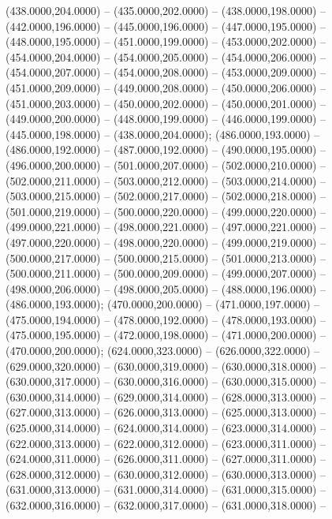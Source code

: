 \begin{scope}[shift={(-231.87,-121.87)}]
\begin{scope}[draw=black,fill=cd7191c,line join=round,line width=0.208pt]
       (438.0000,204.0000) -- (435.0000,202.0000) --
        (438.0000,198.0000) -- (442.0000,196.0000) -- (445.0000,196.0000) --
        (447.0000,195.0000) -- (448.0000,195.0000) -- (451.0000,199.0000) --
        (453.0000,202.0000) -- (454.0000,204.0000) -- (454.0000,205.0000) --
        (454.0000,206.0000) -- (454.0000,207.0000) -- (454.0000,208.0000) --
        (453.0000,209.0000) -- (451.0000,209.0000) -- (449.0000,208.0000) --
        (450.0000,206.0000) -- (451.0000,203.0000) -- (450.0000,202.0000) --
        (450.0000,201.0000) -- (449.0000,200.0000) -- (448.0000,199.0000) --
        (446.0000,199.0000) -- (445.0000,198.0000) -- (438.0000,204.0000);
       (486.0000,193.0000) -- (486.0000,192.0000) --
        (487.0000,192.0000) -- (490.0000,195.0000) -- (496.0000,200.0000) --
        (501.0000,207.0000) -- (502.0000,210.0000) -- (502.0000,211.0000) --
        (503.0000,212.0000) -- (503.0000,214.0000) -- (503.0000,215.0000) --
        (502.0000,217.0000) -- (502.0000,218.0000) -- (501.0000,219.0000) --
        (500.0000,220.0000) -- (499.0000,220.0000) -- (499.0000,221.0000) --
        (498.0000,221.0000) -- (497.0000,221.0000) -- (497.0000,220.0000) --
        (498.0000,220.0000) -- (499.0000,219.0000) -- (500.0000,217.0000) --
        (500.0000,215.0000) -- (501.0000,213.0000) -- (500.0000,211.0000) --
        (500.0000,209.0000) -- (499.0000,207.0000) -- (498.0000,206.0000) --
        (498.0000,205.0000) -- (488.0000,196.0000) -- (486.0000,193.0000);
       (470.0000,200.0000) -- (471.0000,197.0000) --
        (475.0000,194.0000) -- (478.0000,192.0000) -- (478.0000,193.0000) --
        (475.0000,195.0000) -- (472.0000,198.0000) -- (471.0000,200.0000) --
        (470.0000,200.0000);
       (624.0000,323.0000) -- (626.0000,322.0000) --
        (629.0000,320.0000) -- (630.0000,319.0000) -- (630.0000,318.0000) --
        (630.0000,317.0000) -- (630.0000,316.0000) -- (630.0000,315.0000) --
        (630.0000,314.0000) -- (629.0000,314.0000) -- (628.0000,313.0000) --
        (627.0000,313.0000) -- (626.0000,313.0000) -- (625.0000,313.0000) --
        (625.0000,314.0000) -- (624.0000,314.0000) -- (623.0000,314.0000) --
        (622.0000,313.0000) -- (622.0000,312.0000) -- (623.0000,311.0000) --
        (624.0000,311.0000) -- (626.0000,311.0000) -- (627.0000,311.0000) --
        (628.0000,312.0000) -- (630.0000,312.0000) -- (630.0000,313.0000) --
        (631.0000,313.0000) -- (631.0000,314.0000) -- (631.0000,315.0000) --
        (632.0000,316.0000) -- (632.0000,317.0000) -- (631.0000,318.0000) --

\end{scope}
\end{scope}
